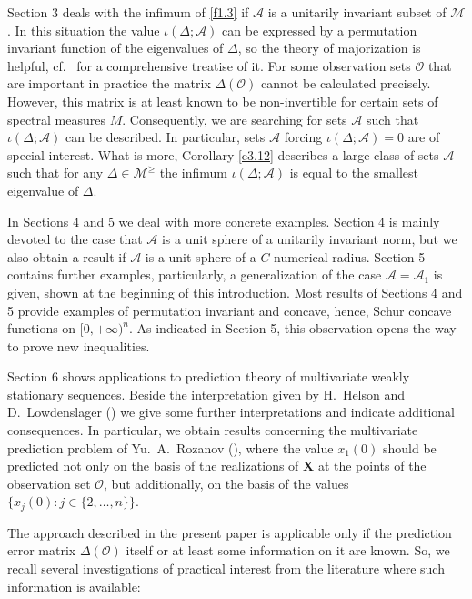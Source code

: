 \documentclass{amsart}
\begin{document}
Section 3 deals with the infimum of \eqref{f1.3} if $\mathcal A$ is a unitarily invariant subset of $\mathcal M$. In this situation the value $\iota (\Delta ; {\mathcal A})$ can be expressed by a permutation invariant function of the eigenvalues of $\Delta$, so the theory of majorization is helpful, cf.~\cite{MOA} for a comprehensive treatise of it.  For some observation sets $\mathcal O$ that are important in practice the matrix $\Delta({\mathcal O})$ cannot be calculated precisely. However, this matrix is at least known to be non-invertible for certain sets of spectral measures $M$. Consequently, we are searching for sets $\mathcal A$ such that $\iota(\Delta; {\mathcal A})$ can be described. In particular, sets $\mathcal A$ forcing $\iota(\Delta; {\mathcal A})=0$ are of special interest. 
What is more, Corollary \ref{c3.12} describes a large class of sets $\mathcal A$ such that for any $\Delta \in {\mathcal M}^\geq$ the infimum $\iota (\Delta ; {\mathcal A})$  is equal to the smallest eigenvalue of $\Delta$. 

In Sections 4 and 5 we deal with more concrete examples. Section 4 is mainly devoted to the case that $\mathcal A$ is a unit sphere of a unitarily invariant norm, but we also obtain a result if $\mathcal A$ is a unit sphere of a $C$-numerical radius. Section 5 contains further examples, particularly, a generalization of the case ${\mathcal A}={\mathcal A}_1$ is given, shown at the beginning of this introduction. Most results of Sections 4 and 5 provide examples of permutation invariant and concave, hence, Schur concave functions on $[0,+\infty)^n$. As indicated in Section 5, this observation opens the way to prove new inequalities. 

Section 6 shows applications to prediction theory of multivariate weakly stationary sequences. Beside the interpretation given by H.~Helson and D.~Lowdenslager (\cite[Thm.~11]{HL}) we give some further interpretations and indicate additional consequences. In particular, we obtain results concerning the multivariate prediction problem of Yu.~A.~Rozanov (\cite{R}), where the value $x_1(0)$ should be predicted not only on the basis of the realizations of $\mathbf X$ at the points of the observation set $\mathcal O$, but additionally, on the basis of the values $\{ x_j(0) : j \in \{ 2,\ldots,n\} \}$. 

The approach described in the present paper is applicable only if the prediction error matrix $\Delta({\mathcal O})$ itself or at least some information on it are known. So, we recall several investigations of practical interest from the literature where such information is available: 
\end{document}
